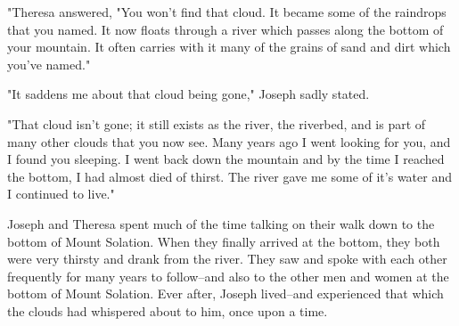 "Theresa answered, "You won't find that cloud. It became some of the raindrops that you named. It now floats through a river which passes along the bottom of your mountain. It often carries with it many of the grains of sand and dirt which you've named."

"It saddens me about that cloud being gone," Joseph sadly stated.

"That cloud isn't gone; it still exists as the river, the riverbed, and is part of many other clouds that you now see. Many years ago I went looking for you, and I found you sleeping. I went back down the mountain and by the time I reached the bottom, I had almost died of thirst. The river gave me some of it's water and I continued to live."

Joseph and Theresa spent much of the time talking on their walk down to the bottom of Mount Solation. When they finally arrived at the bottom, they both were very thirsty and drank from the river. They saw and spoke with each other frequently for many years to follow--and also to the other men and women at the bottom of Mount Solation. Ever after, Joseph lived--and experienced that which the clouds had whispered about to him, once upon a time.